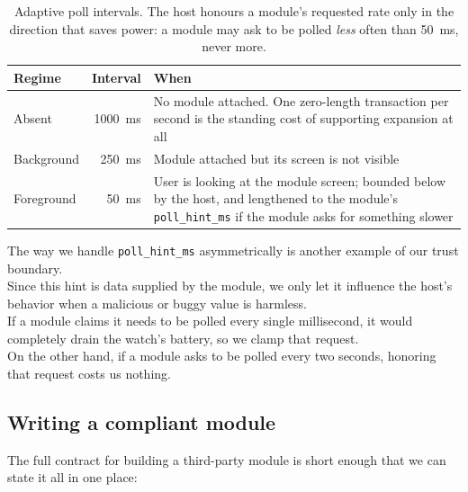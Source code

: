 \documentclass[12pt, a4paper]{article}
\begin{document}
\begin{table}[H]
\centering
\small
\begin{tabular}{@{}l r p{8.2cm}@{}}
\toprule
\textbf{Regime} & \textbf{Interval} & \textbf{When} \\
\midrule
Absent   & \SI{1000}{\milli\second} & No module attached. One zero-length transaction per second is the standing cost of supporting expansion at all \\
Background & \SI{250}{\milli\second} & Module attached but its screen is not visible \\
Foreground & \SI{50}{\milli\second} & User is looking at the module screen; bounded below by the host, and lengthened to the module's \texttt{poll\_hint\_ms} if the module asks for something slower \\
\bottomrule
\end{tabular}
\caption{Adaptive poll intervals. The host honours a module's requested rate only in the direction that saves power: a module may ask to be polled \emph{less} often than \SI{50}{\milli\second}, never more.}
\label{tab:poll}
\end{table}
The way we handle \texttt{poll\_hint\_ms} asymmetrically is another example of our trust boundary. \\
Since this hint is data supplied by the module, we only let it influence the host's behavior when a malicious or buggy value is harmless. \\
If a module claims it needs to be polled every single millisecond, it would completely drain the watch's battery, so we clamp that request. \\
On the other hand, if a module asks to be polled every two seconds, honoring that request costs us nothing.

\subsection{Writing a compliant module}

The full contract for building a third-party module is short enough that we can state it all in one place:
\end{document}
